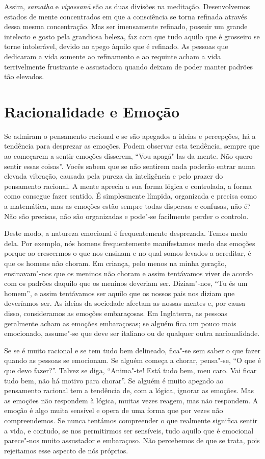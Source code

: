 Assim, \emph{samatha} e \emph{vipassanā} são as duas divisões na meditação.
Desenvolvemos estados de mente concentrados em que a consciência se torna
refinada através dessa mesma concentração. Mas ser imensamente refinado, possuir
um grande intelecto e gosto pela grandiosa beleza, faz com que tudo aquilo que é
grosseiro se torne intolerável, devido ao apego àquilo que é refinado. As
pessoas que dedicaram a vida somente ao refinamento e ao requinte acham a vida
terrivelmente frustrante e assustadora quando deixam de poder manter padrões tão
elevados.

\section{Racionalidade e Emoção}

Se admiram o pensamento racional e se são apegados a ideias e percepções, há a
tendência para desprezar as emoções. Podem observar esta tendência, sempre que
ao começarem a sentir emoções disserem, “Vou apagá"-las da mente. Não quero
sentir essas coisas”. Vocês sabem que se não sentirem nada poderão entrar numa
elevada vibração, causada pela pureza da inteligência e pelo prazer do
pensamento racional. A mente aprecia a sua forma lógica e controlada, a forma
como consegue fazer sentido. É simplesmente límpida, organizada e precisa como a
matemática, mas as emoções estão sempre todas dispersas e confusas, não é?
Não são precisas, não são organizadas e pode"-se facilmente perder o controlo.

Deste modo, a natureza emocional é frequentemente desprezada. Temos medo dela.
Por exemplo, nós homens frequentemente manifestamos medo das emoções porque ao
crescermos o que nos ensinam e no qual somos levados a acreditar, é que os homens
não choram. Em criança, pelo menos na minha geração, ensinavam"-nos que os
meninos não choram e assim tentávamos viver de acordo com os padrões daquilo que
os meninos deveriam ser. Diziam"-nos, “Tu és um homem”, e assim tentávamos ser
aquilo que os nossos pais nos diziam que deveríamos ser. As ideias da sociedade
afectam as nossas mentes e, por causa disso, consideramos as emoções
embaraçosas. Em Inglaterra, as pessoas geralmente acham as emoções embaraçosas;
se alguém fica um pouco mais emocionado, assume"-se que deve ser italiano ou de
qualquer outra nacionalidade.

Se se é muito racional e se tem tudo bem delineado, fica"-se sem saber o que
fazer quando as pessoas se emocionam. Se alguém começa a chorar, pensa"-se, “O
que é que devo fazer?”. Talvez se diga, “Anima"-te! Está tudo bem, meu caro. Vai
ficar tudo bem, não há motivo para chorar”. Se alguém é muito apegado ao
pensamento racional tem a tendência de, com a lógica, ignorar as emoções. Mas as
emoções não respondem à lógica, muitas vezes reagem, mas não respondem. A emoção é
algo muita sensível e opera de uma forma que por vezes não compreendemos.
Se nunca tentámos compreender o que realmente significa sentir a vida, e
contudo, se nos permitirmos ser sensíveis, tudo aquilo que é emocional parece"-nos
muito assustador e embaraçoso. Não percebemos de que se trata, pois
rejeitamos esse aspecto de nós próprios.

